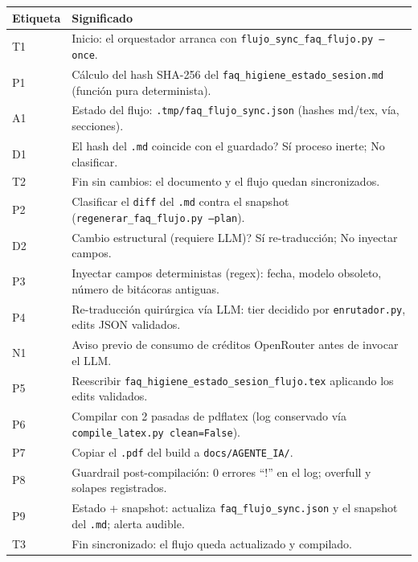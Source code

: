 \documentclass[11pt,a4paper]{article}
\begin{document}
\begin{center}
\vspace{6pt}
\begin{tcolorbox}[cajaContenido, title={\faIcon{table}~Leyenda de etiquetas}]
\small
\begin{tabularx}{\linewidth}{@{}>{\centering\arraybackslash}p{1.4cm}X@{}}
\toprule
\textbf{Etiqueta} & \textbf{Significado} \\ \midrule
T1 & Inicio: el orquestador arranca con \texttt{flujo\_sync\_faq\_flujo.py --once}. \\
P1 & C\'alculo del hash SHA-256 del \texttt{faq\_higiene\_estado\_sesion.md} (funci\'on pura determinista). \\
A1 & Estado del flujo: \texttt{.tmp/faq\_flujo\_sync.json} (hashes md/tex, v\'ia, secciones). \\
D1 & \textquestiondown{}El hash del \texttt{.md} coincide con el guardado? S\'i \textrightarrow{} proceso inerte; No \textrightarrow{} clasificar. \\
T2 & Fin sin cambios: el documento y el flujo quedan sincronizados. \\
P2 & Clasificar el \texttt{diff} del \texttt{.md} contra el snapshot (\texttt{regenerar\_faq\_flujo.py --plan}). \\
D2 & \textquestiondown{}Cambio estructural (requiere LLM)? S\'i \textrightarrow{} re-traducci\'on; No \textrightarrow{} inyectar campos. \\
P3 & Inyectar campos deterministas (regex): fecha, modelo obsoleto, n\'umero de bit\'acoras antiguas. \\
P4 & Re-traducci\'on quir\'urgica v\'ia LLM: tier decidido por \texttt{enrutador.py}, edits JSON validados. \\
N1 & Aviso previo de consumo de cr\'editos OpenRouter antes de invocar el LLM. \\
P5 & Reescribir \texttt{faq\_higiene\_estado\_sesion\_flujo.tex} aplicando los edits validados. \\
P6 & Compilar con 2 pasadas de pdflatex (log conservado v\'ia \texttt{compile\_latex.py clean=False}). \\
P7 & Copiar el \texttt{.pdf} del build a \texttt{docs/AGENTE\_IA/}. \\
P8 & Guardrail post-compilaci\'on: 0 errores ``!'' en el log; overfull y solapes registrados. \\
P9 & Estado + snapshot: actualiza \texttt{faq\_flujo\_sync.json} y el snapshot del \texttt{.md}; alerta audible. \\
T3 & Fin sincronizado: el flujo queda actualizado y compilado. \\
\bottomrule
\end{tabularx}
\end{tcolorbox}
\end{center}
\end{document}
